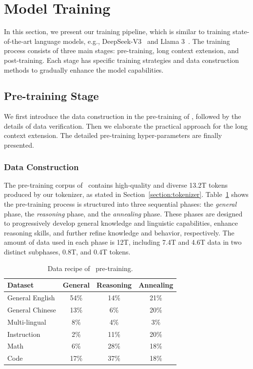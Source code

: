\section{Model Training}
In this section, we present our training pipeline, which is similar to training state-of-the-art language models, e.g., DeepSeek-V3~\cite{deepseekv3} and Llama 3~\cite{dubey2024llama}. The training process consists of three main stages: pre-training, long context extension, and post-training. Each stage has specific training strategies and data construction methods to gradually enhance the model capabilities.


\subsection{Pre-training Stage}


We first introduce the data construction in the pre-training of \modelname, followed by the details of data verification. Then we elaborate the practical approach for the long context extension. The detailed pre-training hyper-parameters are finally presented.

\subsubsection{Data Construction}
The pre-training corpus of \modelname~contains high-quality and diverse 13.2T tokens produced by our tokenizer, as stated in Section~\ref{section:tokenizer}.
Table~\ref{tab:data_recipe} shows the pre-training process is structured into three sequential phases: the \textit{general} phase, the \textit{reasoning} phase, and the \textit{annealing} phase. 
These phases are designed to progressively develop general knowledge and linguistic capabilities, enhance reasoning skills, and further refine knowledge and behavior, respectively.
The amount of data used in each phase is 12T, including 7.4T and 4.6T data in two distinct subphases, 0.8T, and 0.4T tokens.




\begin{table}[h!]
    \centering
        \caption{Data recipe of \modelname~pre-training.}
        \small
        \begin{tabular}{l|c|c|c} 
        \toprule
        \textbf{Dataset} & \textbf{General} & \textbf{Reasoning} & \textbf{Annealing} \\ 
        \midrule
        General English & 54\% & 14\% & 21\% \\ 
        General Chinese & 13\% & 6\% & 20\% \\ 
        Multi-lingual & 8\% & 4\% & 3\% \\ 
        Instruction & 2\% & 11\% & 20\% \\ 
        Math & 6\% & 28\% & 18\% \\ 
        Code & 17\% & 37\% & 18\% \\ 
        \bottomrule
        \end{tabular}
    \label{tab:data_recipe}
\end{table}


